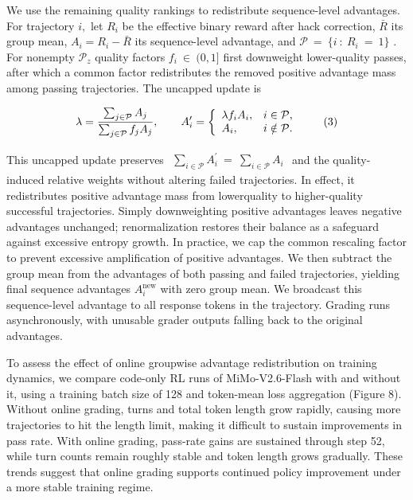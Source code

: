 \documentclass[
  10
]{article}
\newcounter{none} %
\begin{document}
We use the remaining quality rankings to redistribute sequence-level
advantages. For trajectory \(i ,\) let \(R _ { i }\) be the effective
binary reward after hack correction, $\bar{R}$ its group mean,
\(A _ { i } = R _ { i } - \bar { R }\) its sequence-level advantage, and
\(\mathcal { P } \ = \ \{ i \ : \ R _ { i } \ = \ 1 \}\) . For nonempty
\(\mathcal { P } _ { z }\) quality factors
\(f _ { i } ~ \in ~ ( 0 , 1 ]\) first downweight lower-quality passes,
after which a common factor redistributes the removed positive advantage
mass among passing trajectories. The uncapped update is

\[
\lambda = \frac { \sum _ { j \in \mathcal { P } } A _ { j } } { \sum _ { j \in \mathcal { P } } f _ { j } A _ { j } } , \qquad A _ { i } ^ { \prime } = \left\{ \begin{array} { l l } { \lambda f _ { i } A _ { i } , } & { i \in \mathcal { P } , } \\ { A _ { i } , } & { i \notin \mathcal { P } . } \end{array} \right.\tag{3}
\]

This uncapped update preserves
\(\begin{array} { r } { \sum _ { i \in \mathcal { P } } A _ { i } ^ { \prime } \ = \ \sum _ { i \in \mathcal { P } } A _ { i } } \end{array}\)
and the quality-induced relative weights without altering failed
trajectories. In effect, it redistributes positive advantage mass from
lowerquality to higher-quality successful trajectories. Simply
downweighting positive advantages leaves negative advantages unchanged;
renormalization restores their balance as a safeguard against excessive
entropy growth. In practice, we cap the common rescaling factor to
prevent excessive amplification of positive advantages. We then subtract
the group mean from the advantages of both passing and failed
trajectories, yielding final sequence advantages
\(A _ { i } ^ { \mathrm { n e w } }\) with zero group mean. We broadcast
this sequence-level advantage to all response tokens in the trajectory.
Grading runs asynchronously, with unusable grader outputs falling back
to the original advantages.

To assess the effect of online groupwise advantage redistribution on
training dynamics, we compare code-only RL runs of MiMo-V2.6-Flash with
and without it, using a training batch size of 128 and token-mean loss
aggregation (Figure 8). Without online grading, turns and total token
length grow rapidly, causing more trajectories to hit the length limit,
making it difficult to sustain improvements in pass rate. With online
grading, pass-rate gains are sustained through step 52, while turn
counts remain roughly stable and token length grows gradually. These
trends suggest that online grading supports continued policy improvement
under a more stable training regime.
\end{document}

